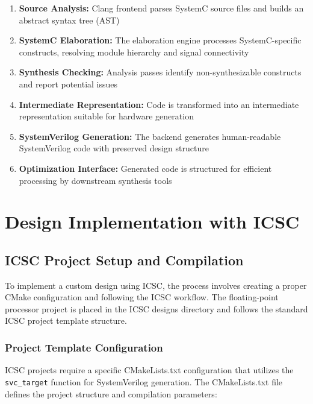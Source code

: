 \begin{enumerate}
\item \textbf{Source Analysis:} Clang frontend parses SystemC source files and builds an abstract syntax tree (AST)
\item \textbf{SystemC Elaboration:} The elaboration engine processes SystemC-specific constructs, resolving module hierarchy and signal connectivity
\item \textbf{Synthesis Checking:} Analysis passes identify non-synthesizable constructs and report potential issues
\item \textbf{Intermediate Representation:} Code is transformed into an intermediate representation suitable for hardware generation
\item \textbf{SystemVerilog Generation:} The backend generates human-readable SystemVerilog code with preserved design structure
\item \textbf{Optimization Interface:} Generated code is structured for efficient processing by downstream synthesis tools
\end{enumerate}

\section{Design Implementation with ICSC}
\label{sec:design_implementation}

\subsection{ICSC Project Setup and Compilation}
\label{subsec:icsc_project_setup}

To implement a custom design using ICSC, the process involves creating a proper CMake configuration and following the ICSC workflow. The floating-point processor project is placed in the ICSC designs directory and follows the standard ICSC project template structure.

\subsubsection{Project Template Configuration}
\label{subsubsec:project_template}

ICSC projects require a specific CMakeLists.txt configuration that utilizes the \texttt{svc\_target} function for SystemVerilog generation. The CMakeLists.txt file defines the project structure and compilation parameters:

